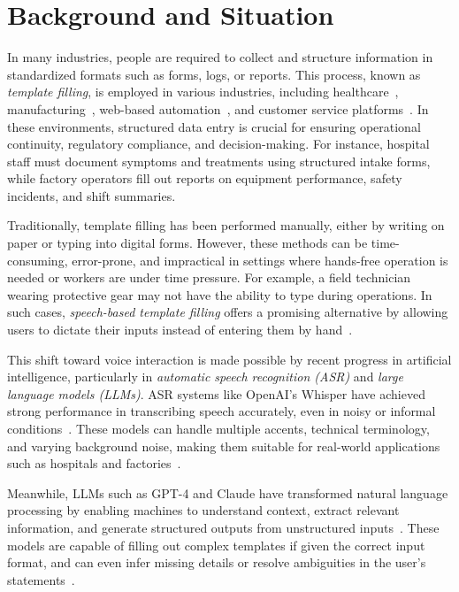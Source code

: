 
\section{Background and Situation}

In many industries, people are required to collect and structure information in standardized formats such as forms, logs, or reports. This process, known as \textit{template filling}, is employed in various industries, including healthcare~\cite{du2021template}, manufacturing~\cite{wang2021spoken}, web-based automation~\cite{chen2024webform}, and customer service platforms~\cite{sun2023slot}. In these environments, structured data entry is crucial for ensuring operational continuity, regulatory compliance, and decision-making. For instance, hospital staff must document symptoms and treatments using structured intake forms, while factory operators fill out reports on equipment performance, safety incidents, and shift summaries.

Traditionally, template filling has been performed manually, either by writing on paper or typing into digital forms. However, these methods can be time-consuming, error-prone, and impractical in settings where hands-free operation is needed or workers are under time pressure. For example, a field technician wearing protective gear may not have the ability to type during operations. In such cases, \textit{speech-based template filling} offers a promising alternative by allowing users to dictate their inputs instead of entering them by hand~\cite{wang2021spoken}.

This shift toward voice interaction is made possible by recent progress in artificial intelligence, particularly in \textit{automatic speech recognition (ASR)} and \textit{large language models (LLMs)}. ASR systems like OpenAI’s Whisper have achieved strong performance in transcribing speech accurately, even in noisy or informal conditions~\cite{radford2023whisper, fathullah2023prompting}. These models can handle multiple accents, technical terminology, and varying background noise, making them suitable for real-world applications such as hospitals and factories~\cite{wang2021spoken}.

Meanwhile, LLMs such as GPT-4 and Claude have transformed natural language processing by enabling machines to understand context, extract relevant information, and generate structured outputs from unstructured inputs~\cite{du2021template, schick2023toolformer}. These models are capable of filling out complex templates if given the correct input format, and can even infer missing details or resolve ambiguities in the user's statements~\cite{mialon2023augmented}.

